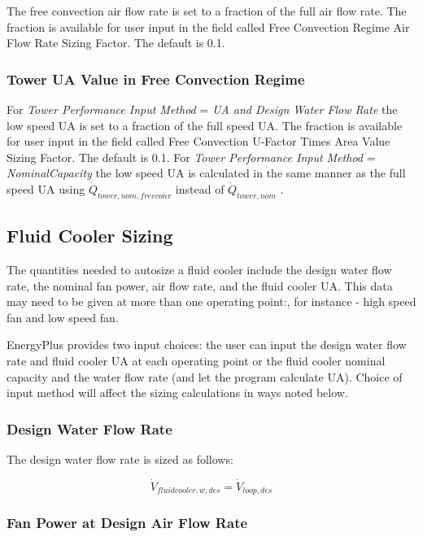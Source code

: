 The free convection air flow rate is set to a fraction of the full air flow rate. The fraction is available for user input in the field called Free Convection Regime Air Flow Rate Sizing Factor. The default is 0.1.

\subsubsection{Tower UA Value in Free Convection Regime}\label{tower-ua-value-in-free-convection-regime}

For \emph{Tower Performance Input Method} = \emph{UA and Design Water Flow Rate} the low speed UA is set to a fraction of the full speed UA. The fraction is available for user input in the field called Free Convection U-Factor Times Area Value Sizing Factor. The default is 0.1. For \emph{Tower Performance Input Method} = \emph{NominalCapacity} the low speed UA is calculated in the same manner as the full speed UA using \(\dot Q_{tower,nom,freeconv}\) instead of \(\dot Q_{tower,nom}\) .

\subsection{Fluid Cooler Sizing}\label{fluid-cooler-sizing}

The quantities needed to autosize a fluid cooler include the design water flow rate, the nominal fan power, air flow rate, and the fluid cooler UA. This data may need to be given at more than one operating point:, for instance - high speed fan and low speed fan.

EnergyPlus provides two input choices: the user can input the design water flow rate and fluid cooler UA at each operating point or the fluid cooler nominal capacity and the water flow rate (and let the program calculate UA). Choice of input method will affect the sizing calculations in ways noted below.

\subsubsection{Design Water Flow Rate}\label{design-water-flow-rate-1}

The design water flow rate is sized as follows:

\begin{equation}
{\dot V_{fluidcooler,w,des}} = {\dot V_{loop,des}}
\end{equation}

\subsubsection{Fan Power at Design Air Flow Rate}\label{fan-power-at-design-air-flow-rate-1}

